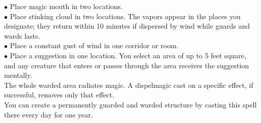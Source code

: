 \documentclass[11pt, A4paper, english]{article}
\begin{document}
$\bullet$ Place magic mouth in two locations. \\
$\bullet$ Place stinking cloud in two locations. The vapors appear in the places you designate; they return within 10 minutes if dispersed by wind while guards and wards lasts. \\
$\bullet$ Place a constant gust of  wind in one corridor or room. \\
$\bullet$ Place a suggestion in one location. You select an area of up to 5 feet square, and any creature that enters or passes through the area receives the suggestion mentally. \\
The whole warded area radiates magic. A dispelmagic cast on a specific effect, if successful, removes only that effect. \\
You can create a permanently guarded and warded structure by casting this spell there every day for one year.
\end{document}
